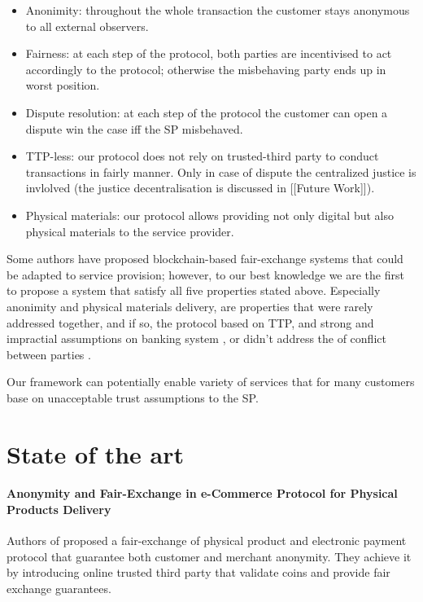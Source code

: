\documentclass{ieeeaccess}
\begin{document}
\begin{itemize}
\item Anonimity:
throughout the whole transaction the customer stays anonymous to all external observers.
\item Fairness:
at each step of the protocol, both parties are incentivised to act accordingly to the protocol; otherwise the misbehaving party ends up in worst position.
\item Dispute resolution: at each step of the protocol the customer can open a dispute win the case iff the SP misbehaved.
\item TTP-less: our protocol does not rely on trusted-third party to conduct transactions in fairly manner. Only in case of dispute the centralized justice is invlolved (the justice decentralisation is discussed in {[}{[}Future Work{]}{]}).
\item Physical materials: our protocol allows providing not only
  digital but also physical materials to the service provider.
\end{itemize}

Some authors have proposed blockchain-based fair-exchange systems that
could be adapted to service provision; however, to our best knowledge we
are the first to propose a system that satisfy all five properties
stated above. Especially anonimity and physical materials delivery, are
properties that were rarely addressed together, and if so, the protocol
based on TTP, and strong and impractial assumptions on banking system
\cite{birjoveanu2015anonymity}, or didn't address the of conflict
between parties \cite{altawy2017lelantos}.

Our framework can potentially enable variety of services that for many
customers base on unacceptable trust assumptions to the SP.


\section{State of the art}\label{state-of-the-art}

\paragraph{Anonymity and Fair-Exchange in e-Commerce Protocol for
Physical Products
Delivery}\label{anonymity-and-fair-exchange-in-e-commerce-protocol-for-physical-products-delivery}

Authors of \cite{birjoveanu2015anonymity} proposed a
fair-exchange of physical product and electronic payment protocol that
guarantee both customer and merchant anonymity. They achieve it by
introducing online trusted third party that validate coins and provide
fair exchange guarantees.
\end{document}
